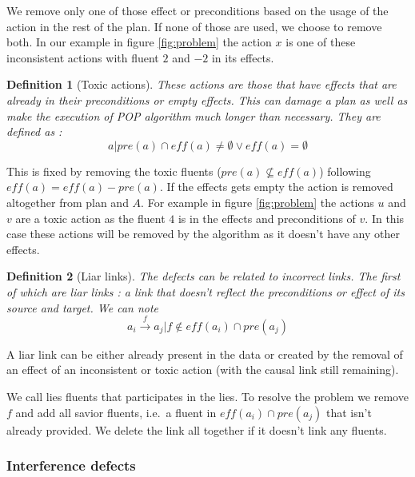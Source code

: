 \documentclass[]{article}
\newtheorem{definition}{Definition}
\begin{document}
We remove only one of those effect or preconditions based on the usage
of the action in the rest of the plan. If none of those are used, we
choose to remove both. In our example in figure \ref{fig:problem} the
action \(x\) is one of these inconsistent actions with fluent \(2\) and
\(-2\) in its effects.

\begin{definition}[Toxic actions]

These actions are those that have effects that are already in their
preconditions or empty effects. This can damage a plan as well as make
the execution of POP algorithm much longer than necessary. They are
defined as :
\[a | pre(a) \cap eff(a) \neq \emptyset \lor eff(a) = \emptyset\]

\end{definition}

This is fixed by removing the toxic fluents
(\(pre(a) \nsubseteq eff(a)\)) following \(eff(a) = eff(a)-pre(a)\). If
the effects gets empty the action is removed altogether from plan and
\(A\). For example in figure \ref{fig:problem} the actions \(u\) and
\(v\) are a toxic action as the fluent \(4\) is in the effects and
preconditions of \(v\). In this case these actions will be removed by
the algorithm as it doesn't have any other effects.

\begin{definition}[Liar links]

The defects can be related to incorrect links. The first of which are
liar links : a link that doesn't reflect the preconditions or effect of
its source and target. We can note
\[a_i \xrightarrow{f} a_j | f \notin eff(a_i) \cap pre(a_j)\]

\end{definition}

A liar link can be either already present in the data or created by the
removal of an effect of an inconsistent or toxic action (with the causal
link still remaining).

We call lies fluents that participates in the lies. To resolve the
problem we remove \(f\) and add all savior fluents, i.e.~a fluent in
\(eff(a_i) \cap pre(a_j)\) that isn't already provided. We delete the
link all together if it doesn't link any fluents.

\subsubsection{Interference defects}\label{interference-defects}
\end{document}
